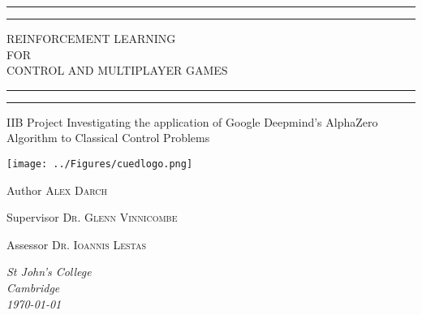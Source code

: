 \documentclass[main.tex]{subfiles}
\begin{document}
\begin{titlepage} %

	\centering %
	\scshape %
	\vspace*{\baselineskip} %
	\rule{\textwidth}{1.6pt}\vspace*{-\baselineskip}\vspace*{2pt} %
	\rule{\textwidth}{0.4pt} %
	\vspace{0.75\baselineskip} %
	
	{\LARGE REINFORCEMENT LEARNING \\ FOR \\ CONTROL AND MULTIPLAYER GAMES \\} %
	
	\vspace{0.75\baselineskip} %
	\rule{\textwidth}{0.4pt}\vspace*{-\baselineskip}\vspace{3.2pt} %
	\rule{\textwidth}{1.6pt} %
	\vspace{1\baselineskip} %
	
	
	IIB Project Investigating the application of Google Deepmind's AlphaZero Algorithm to Classical Control Problems 
	
    \vspace*{4\baselineskip} %
    \texttt{[image: ../Figures/cuedlogo.png]}
    \vspace*{3\baselineskip} %
	
	
	Author
	\vspace{0.5\baselineskip} %
    {\scshape\Large Alex Darch} %

    Supervisor
	\vspace{0.5\baselineskip} %
    {\scshape\Large Dr. Glenn Vinnicombe} %
    
    Assessor
	\vspace{0.5\baselineskip} %
	{\scshape\Large Dr. Ioannis Lestas} %
    	
	\vfill %
	\vspace{0.3\baselineskip} %
    \textit{St John's College \\ Cambridge \\ \today}

\end{titlepage}
\end{document}
